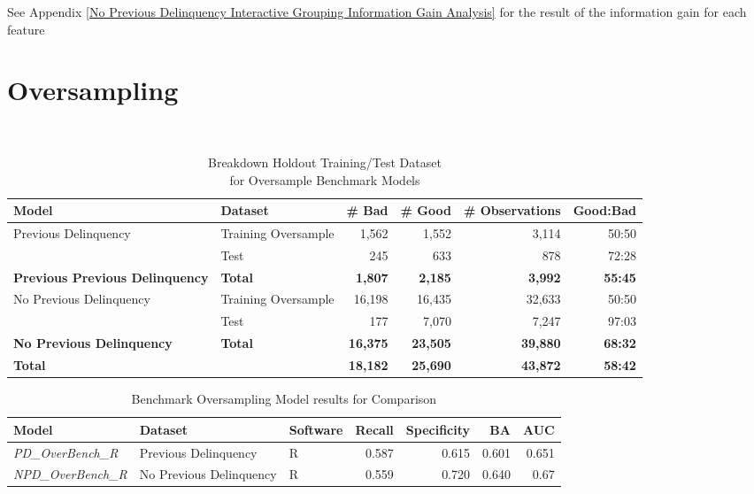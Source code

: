 See Appendix \ref{No Previous Delinquency Interactive Grouping Information Gain Analysis} for the result of the information gain for each feature

\section{Oversampling}

\begin{table}[H]
	\centering\
	\resizebox{\textwidth}{!}
	{
		\begin{tabular}{l l r r r r}
			\hline
			\textbf{Model} &  \textbf{Dataset} & \textbf{\# Bad} & \textbf{\# Good} & \textbf{\# Observations} & \textbf{Good:Bad} \\
			\hline
			Previous Delinquency & Training Oversample & 1,562 & 1,552 & 3,114 & 50:50\\
			& Test & 245 & 633 & 878 & 72:28\\\hline
			\textbf{Previous Previous Delinquency}     & \textbf{Total} & \textbf{1,807} & \textbf{2,185} & \textbf{3,992} & \textbf{55:45} \\
			\hline
			No Previous Delinquency & Training Oversample & 16,198 & 16,435 & 32,633 & 50:50 \\ 
			& Test & 177 & 7,070 & 7,247 & 97:03 	\\\hline
			\textbf{No Previous Delinquency}     & \textbf{Total} & \textbf{16,375} & \textbf{23,505} & \textbf{39,880} & \textbf{68:32} \\
			\hline
			\textbf{Total } 	&     	     & \textbf{18,182} & \textbf{25,690} & \textbf{43,872} & \textbf{58:42}\\ \hline
		\end{tabular}
	}
	\caption{Breakdown Holdout Training/Test Dataset \\for Oversample Benchmark Models}
	\label{table:benchmark_holdout_oversample_train_test}
\end{table}

\begin{table}[H]
	\centering
	\resizebox{\textwidth}{!}
	{
		\begin{tabular}{l l l r r r r}
			\hline
			\textbf{Model} & \textbf{Dataset} & \textbf{Software} & \textbf{Recall} & \textbf{Specificity} & \textbf{BA} & \textbf{AUC}  \\ \hline
			\textit{PD\_OverBench\_R} & Previous Delinquency & R & 0.587 & 0.615 & 0.601 & 0.651   \\ \hline
			\textit{NPD\_OverBench\_R} & No Previous Delinquency & R & 0.559 & 0.720 & 0.640 & 0.67   \\ \hline
		\end{tabular}
	}
	\caption{Benchmark Oversampling Model results for Comparison}
	\label{table:benchmodelOver}
\end{table}

